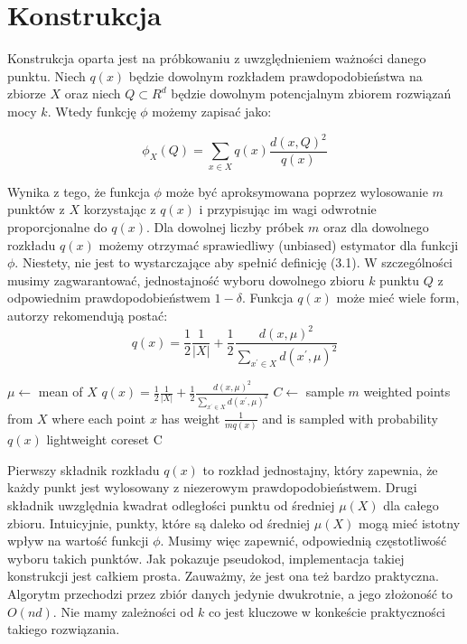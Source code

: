 \section{Konstrukcja}\label{construction}

Konstrukcja oparta jest na próbkowaniu z uwzględnieniem ważności danego punktu.
Niech $q(x)$ będzie dowolnym rozkładem prawdopodobieństwa na zbiorze $X$ oraz niech $Q \subset R^{d}$ będzie dowolnym potencjalnym zbiorem rozwiązań mocy $k$. 
Wtedy funkcję $\phi$ możemy zapisać jako:

\begin{equation}
    \phi_{X}(Q) = \sum_{x \in X} q(x) \frac{d(x, Q)^{2}}{q(x)}
\end{equation}

\noindent
Wynika z tego, że funkcja $\phi$ może być aproksymowana poprzez wylosowanie $m$ punktów z $X$ korzystając z $q(x)$ i przypisując im wagi odwrotnie proporcjonalne do $q(x)$.
Dla dowolnej liczby próbek $m$ oraz dla dowolnego rozkładu $q(x)$ możemy otrzymać sprawiedliwy (unbiased) estymator dla funkcji $\phi$.
Niestety, nie jest to wystarczające aby spełnić definicję (3.1).
W szczególności musimy zagwarantować, jednostajność wyboru dowolnego zbioru $k$ punktu $Q$ z odpowiednim prawdopodobieństwem $1 - \delta$.
Funkcja $q(x)$ może mieć wiele form, autorzy rekomendują postać:
\begin{equation}
    q(x) = \frac{1}{2}\frac{1}{|X|} + \frac{1}{2}\frac{d(x, \mu)^2}{\sum_{x^{'} \in X}d(x^{'}, \mu)^2}
\end{equation}

\begin{algorithm}
    \caption{}
\begin{algorithmic}
     
        \State $\mu \leftarrow$ mean of $X$
            \State $q(x) = \frac{1}{2}\frac{1}{|X|} + \frac{1}{2}\frac{d(x, \mu)^2}{\sum_{x^{'} \in X}d(x^{'}, \mu)^2}$
        \EndFor
        \State $C \leftarrow$ sample $m$ weighted points from $X$ where each point $x$ has weight $\frac{1}{mq(x)}$ and is sampled with probability $q(x)$
    \EndProcedure
    \Return lightweight coreset C
\end{algorithmic}
\end{algorithm}

\noindent
Pierwszy składnik rozkładu $q(x)$ to rozkład jednostajny, który zapewnia, że każdy punkt jest wylosowany z niezerowym prawdopodobieństwem.
Drugi składnik uwzględnia kwadrat odległości punktu od średniej $\mu(X)$ dla całego zbioru.
Intuicyjnie, punkty, które są daleko od średniej $\mu(X)$ mogą mieć istotny wpływ na wartość funkcji $\phi$.
Musimy więc zapewnić, odpowiednią częstotliwość wyboru takich punktów. 
Jak pokazuje pseudokod, implementacja takiej konstrukcji jest całkiem prosta.
Zauważmy, że jest ona też bardzo praktyczna.
Algorytm przechodzi przez zbiór danych jedynie dwukrotnie, a jego złożoność to $O(nd)$.
Nie mamy zależności od $k$ co jest kluczowe w konkeście praktyczności takiego rozwiązania.